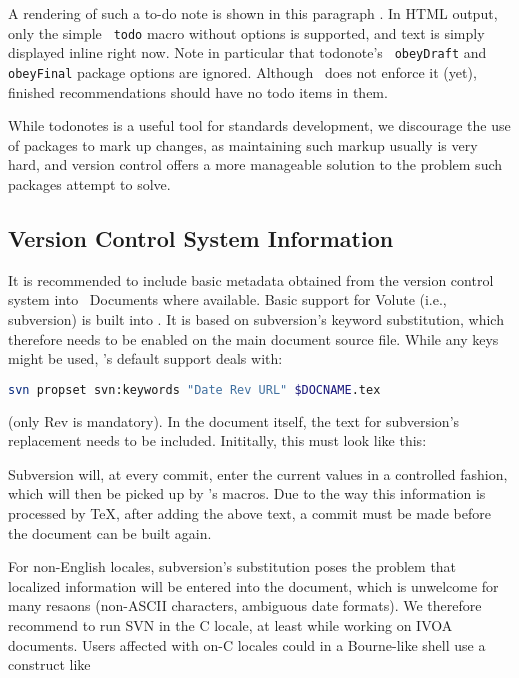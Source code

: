 \documentclass[11pt,a4paper]{ivoa}
\newcommand{\texword}[1]{\texttt{\color{texcolor} #1}}
\begin{document}
A rendering of such a to-do note is shown in this paragraph
. In HTML output,
only the simple \texword{todo} macro without options is supported, and
text is simply displayed inline right now.  Note in particular that
todonote's \texword{obeyDraft} and \texword{obeyFinal} package options
are ignored.  Although \ivoatex\ does not enforce it (yet), finished
recommendations should have no todo items in them.

While todonotes is a useful tool for standards development, we
discourage the use of packages to mark up changes, as maintaining such
markup usually is very hard, and version control offers a more
manageable solution to the problem such packages attempt to solve.

\subsection{Version Control System Information}

It is recommended to include basic metadata obtained from the version
control system into \ivoatex~Documents where available.  Basic support
for Volute (i.e., subversion) is built into \ivoatex.  It is based on
subversion's
keyword substitution, which therefore needs to be enabled on the 
main document source file.
While any keys might be used, \ivoatex's default support deals with:

\begin{lstlisting}[language=sh]
svn propset svn:keywords "Date Rev URL" $DOCNAME.tex
\end{lstlisting}

(only Rev is mandatory).
In the document itself, the text for subversion's replacement needs to
be included.  Inititally, this must look like this:



Subversion will, at every commit, enter the current values in a
controlled fashion, which will then be picked up by \ivoatex's macros.
Due to the way this information is processed by \TeX, after adding the above
text, a commit must be made before the document can be built again.

For non-English locales, subversion's substitution poses the problem that
localized information will be entered into the document, which is
unwelcome for many resaons (non-ASCII characters, ambiguous date
formats).  We therefore recommend to run SVN in the C
locale, at least while working on IVOA documents.  Users affected with
on-C locales
could in a Bourne-like shell use a construct like
\end{document}
